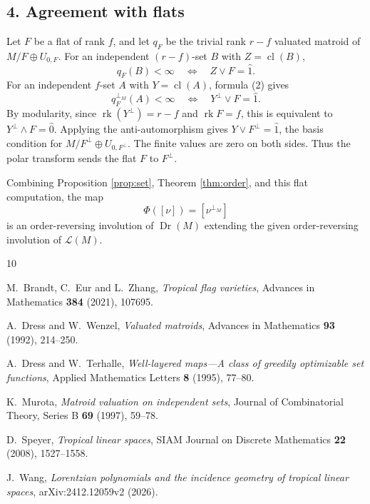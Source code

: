 \documentclass[12pt]{article}
\newcommand{\cL}{\mathcal L}
\newcommand{\Dr}{\operatorname{Dr}}
\newcommand{\rk}{\operatorname{rk}}
\newcommand{\cl}{\operatorname{cl}}
\begin{document}
\subsection*{4. Agreement with flats}

Let $F$ be a flat of rank $f$, and let $q_F$ be the trivial rank
$r-f$ valuated matroid of $M/F\oplus U_{0,F}$.  For an independent
$(r-f)$-set $B$ with $Z=\cl(B)$,
\[
        q_F(B)<\infty\quad\Longleftrightarrow\quad Z\vee F=\hat1.
\]
For an independent $f$-set $A$ with $Y=\cl(A)$, formula (2) gives
\[
 q_F^{\perp_M}(A)<\infty
 \quad\Longleftrightarrow\quad Y^\perp\vee F=\hat1 .
\]
By modularity, since $\rk(Y^\perp)=r-f$ and $\rk F=f$, this is
equivalent to $Y^\perp\wedge F=\hat0$.  Applying the anti-automorphism
gives $Y\vee F^\perp=\hat1$, the basis condition for
$M/F^\perp\oplus U_{0,F^\perp}$.  The finite values are zero on both
sides.  Thus the polar transform sends the flat $F$ to $F^\perp$.

Combining Proposition \ref{prop:set}, Theorem \ref{thm:order}, and this
flat computation, the map
\[
        \Phi([\nu])=[\nu^{\perp_M}]
\]
is an order-reversing involution of $\Dr(M)$ extending the given
order-reversing involution of $\cL(M)$.

\begin{thebibliography}{10}

M.~Brandt, C.~Eur and L.~Zhang,
\emph{Tropical flag varieties},
Advances in Mathematics \textbf{384} (2021), 107695.

A.~Dress and W.~Wenzel,
\emph{Valuated matroids},
Advances in Mathematics \textbf{93} (1992), 214--250.

A.~Dress and W.~Terhalle,
\emph{Well-layered maps---A class of greedily optimizable set functions},
Applied Mathematics Letters \textbf{8} (1995), 77--80.

K.~Murota,
\emph{Matroid valuation on independent sets},
Journal of Combinatorial Theory, Series B \textbf{69} (1997), 59--78.

D.~Speyer,
\emph{Tropical linear spaces},
SIAM Journal on Discrete Mathematics \textbf{22} (2008), 1527--1558.

J.~Wang,
\emph{Lorentzian polynomials and the incidence geometry of tropical
linear spaces},
arXiv:2412.12059v2 (2026).

\end{thebibliography}
\end{document}
